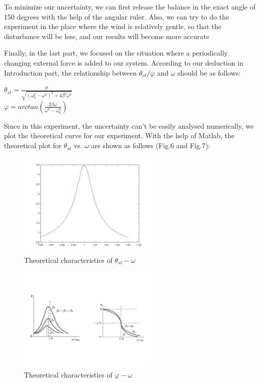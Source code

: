 \documentclass[a4paper,12pt]{article}
\begin{document}
\par To minimize our uncertainty, we can first release the balance in the exact angle of 150 degrees with the help of the angular ruler. Also, we can try to do the experiment in the place where the wind is relatively gentle, so that the disturbance will be less, and our results will become more accurate
\par Finally, in the last part, we focused on the situation where a periodically changing external force is added to our system. According to our deduction in Introduction part, the relationship between $\theta_{st}/\varphi$ and $\omega$ should be as follows:
\begin{center}
$\displaystyle \theta_{st} = \frac{\mu}{\sqrt{(\omega_0^2 - \omega^2)^2 + 4\beta^2\omega^2}} $ \\[3 mm]
$\displaystyle \varphi = arctan(\frac{2\beta \omega}{\omega^2-\omega_0^2})$
\end{center}
\par Since in this experiment, the uncertainty can't be easily analysed numerically, we plot the theoretical curve for our experiment. With the help of Matlab, the theoretical plot for $\theta_{st}$ vs. $\omega$ are shown as follows (Fig.6 and Fig.7):
\begin{figure}[h] 
    \centering
    \includegraphics[width=0.6\textwidth]{Figc1} 
    \caption{Theoretical characteristics of $\theta_{st}-\omega$} 
\end{figure}
\begin{figure}[h] 
    \centering
    \includegraphics[width=0.6\textwidth]{Figc2} 
    \caption{Theoretical characteristics of $\varphi-\omega$ \cite{labmanual}} 
\end{figure}
\end{document}
